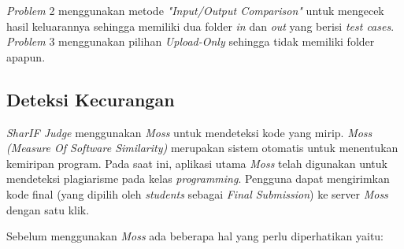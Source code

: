 \textit{Problem} 2 menggunakan metode \textit{"Input/Output Comparison"} untuk mengecek hasil keluarannya sehingga memiliki dua folder \textit{in} dan \textit{out} yang berisi \textit{test cases}. \textit{Problem} 3 menggunakan pilihan \textit{Upload-Only} sehingga tidak memiliki folder apapun.

\subsection{Deteksi Kecurangan}
\label{subsec:deteksi_kecurangan}
\textit{SharIF Judge} menggunakan \textit{Moss} untuk mendeteksi kode yang mirip. \textit{Moss (Measure Of Software Similarity)} merupakan sistem otomatis untuk menentukan kemiripan program. Pada saat ini, aplikasi utama \textit{Moss} telah digunakan untuk mendeteksi plagiarisme pada kelas \textit{programming}. Pengguna dapat mengirimkan kode final (yang dipilih oleh \textit{students} sebagai \textit{Final Submission}) ke server \textit{Moss} dengan satu klik.

Sebelum menggunakan \textit{Moss} ada beberapa hal yang perlu diperhatikan yaitu:

